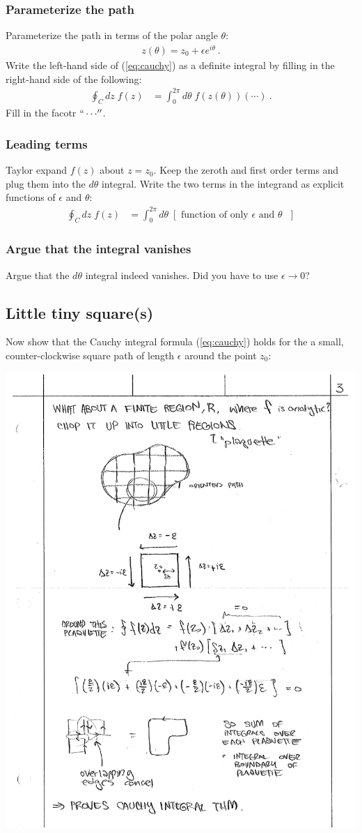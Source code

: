 \documentclass[12pt]{article}
\numberwithin{equation}{subsection}    %
\begin{document}
\subsubsection{Parameterize the path}

Parameterize the path in terms of the polar angle $\theta$:
\begin{align}
	z(\theta) = z_0 + \epsilon e^{i\theta} \ .
\end{align}
Write the left-hand side of (\ref{eq:cauchy}) as a definite integral by filling in the right-hand side of the following:
\begin{align}
	\oint_C dz\; f(z)
	&= 
	\int_0^{2\pi} d\theta \;
	f\left(z(\theta)\right) (\cdots) \ .
\end{align}
Fill in the facotr $``\cdots''$.

\subsubsection{Leading terms}

Taylor expand $f(z)$ about $z = z_0$. Keep the zeroth and first order terms and plug them into the $d\theta$ integral. Write the two terms in the integrand as explicit functions of $\epsilon$ and $\theta$:
\begin{align}
	\oint_C dz\; f(z) 
	& = 
	\int_0^{2\pi} d\theta \; \left[ \text{ function of only }\epsilon\text{ and }\theta\text{ } \right]
\end{align}

\subsubsection{Argue that the integral vanishes}

Argue that the $d\theta$ integral indeed vanishes. Did you have to use $\epsilon \to 0$?

\subsection{Little tiny square(s)}

Now show that the Cauchy integral formula (\ref{eq:cauchy}) holds for the a small, counter-clockwise square path of length $\epsilon$ around the point $z_0$:
\begin{center}
\includegraphics[width=.3\textwidth]{P231_2018_HW3a_fig2}
\end{center}
\end{document}
